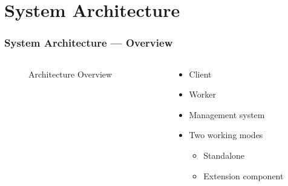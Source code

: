 \section{System Architecture}
\begin{frame}
  \frametitle{System Architecture --- Overview}
  \begin{columns}

    \begin{column}{.55\textwidth}
      \begin{figure}
        \resizebox{\linewidth}{!}{
          
        }
        \caption{Architecture Overview}
        \label{fig:archi-overview}
      \end{figure}
    \end{column}
    \begin{column}{.4\textwidth}
      \begin{itemize}
        \item Client
        \item Worker
        \item Management system
        \item Two working modes
          \begin{itemize}
            \item Standalone
            \item Extension component
          \end{itemize}
      \end{itemize}
    \end{column}

  \end{columns}
\end{frame}
